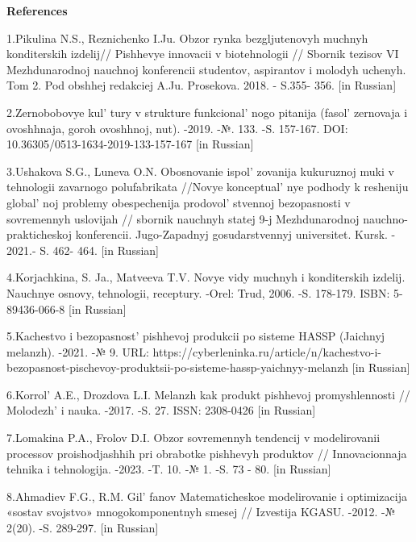\begin{center}
{\bfseries References}
\end{center}

\begin{references}
1.Pikulina N.S., Reznichenko I.Ju. Obzor rynka bezgljutenovyh muchnyh
konditerskih izdelij// Pishhevye innovacii v biotehnologii // Sbornik
tezisov VI Mezhdunarodnoj nauchnoj konferencii studentov, aspirantov i
molodyh uchenyh. Tom 2. Pod obshhej redakciej A.Ju. Prosekova. 2018. -
S.355- 356. {[}in Russian{]}

2.Zernobobovye kul' tury v strukture
funkcional' nogo pitanija (fasol'{}
zernovaja i ovoshhnaja, goroh \linebreak  ovoshhnoj, nut). -2019. -№. 133. -S. 157-167. DOI: 10.36305/0513-1634-2019-133-157-167 {[}in Russian{]}

3.Ushakova S.G., Luneva O.N. Obosnovanie ispol' zovanija
kukuruznoj muki v tehnologii zavarnogo polufabrikata //Novye
konceptual' nye podhody k resheniju
global' noj problemy obespechenija
prodovol' stvennoj bezopasnosti v sovremennyh uslovijah
// sbornik nauchnyh statej 9-j Mezhdunarodnoj nauchno-prakticheskoj
konferencii. Jugo-Zapadnyj gosudarstvennyj universitet. Kursk. - 2021.-
S. 462- 464. {[}in Russian{]}

4.Korjachkina, S. Ja., Matveeva T.V. Novye vidy muchnyh i konditerskih
izdelij. Nauchnye osnovy, \linebreak tehnologii, receptury. -Orel: Trud, 2006. -S.
178-179. ISBN: 5-89436-066-8 {[}in Russian{]}

5.Kachestvo i bezopasnost'{} pishhevoj produkcii po
sisteme HASSP (Jaichnyj melanzh). -2021. -№ 9. URL:
https://cyberleninka.ru/article/n/kachestvo-i-bezopasnost-pischevoy-produktsii-po-sisteme-hassp-yaichnyy-melanzh
{[}in Russian{]}

6.Korrol'{} A.E., Drozdova L.I. Melanzh kak produkt
pishhevoj promyshlennosti // Molodezh'{} i nauka. -2017.
-S. 27. ISSN: 2308-0426 {[}in Russian{]}

7.Lomakina P.A., Frolov D.I. Obzor sovremennyh tendencij v modelirovanii
processov proishodjashhih pri obrabotke pishhevyh produktov //
Innovacionnaja tehnika i tehnologija. -2023. -T. 10. -№ 1. -S. 73 - 80.
{[}in Russian{]}

8.Ahmadiev F.G., R.M. Gil' fanov Matematicheskoe
modelirovanie i optimizacija «sostav svojstvo» \linebreak mnogokomponentnyh smesej
// Izvestija KGASU. -2012. -№ 2(20). -S. 289-297. {[}in Russian{]}


\end{references}
